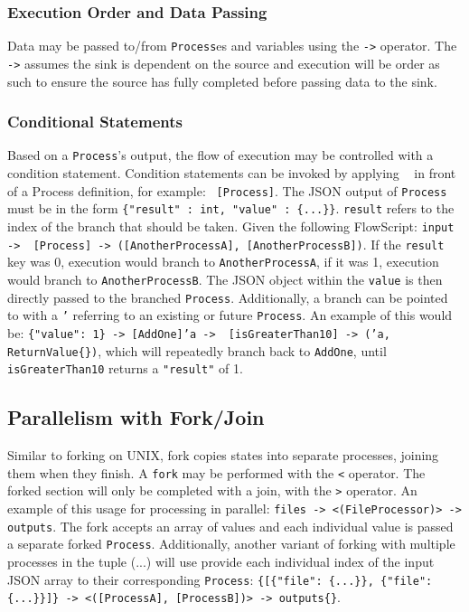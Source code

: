 \documentclass{article}
\begin{document}
			\subsubsection{Execution Order and Data Passing} Data may be passed to/from \texttt{Process}es and variables using the \texttt{->} operator. The \texttt{->} assumes the sink is dependent on the source and execution will be order as such to ensure the source has fully completed before passing data to the sink.
			\subsubsection{Conditional Statements} Based on a \texttt{Process}'s output, the flow of execution may be controlled with a condition statement. Condition statements can be invoked by applying \texttt{~} in front of a Process definition, for example: \texttt{~[Process]}. The JSON output of \texttt{Process} must be in the form \texttt{\{"result" : int, "value" : \{...\}\}}. \texttt{result} refers to the index of the branch that should be taken. Given the following FlowScript: \texttt{input{} -> ~[Process] -> ([AnotherProcessA], [AnotherProcessB])}. If the \texttt{result} key was 0, execution would branch to \texttt{AnotherProcessA}, if it was 1, execution would branch to \texttt{AnotherProcessB}. The JSON object within the \texttt{value} is then directly passed to the branched \texttt{Process}. Additionally, a branch can be pointed to with a \texttt{'} referring to an existing or future \texttt{Process}. An example of this would be: \texttt{\{"value": 1\} -> [AddOne]'a -> ~[isGreaterThan10] -> ('a, ReturnValue\{\})}, which will repeatedly branch back to \texttt{AddOne}, until \texttt{isGreaterThan10} returns a \texttt{"result"} of 1.
			\subsection{Parallelism with Fork/Join} Similar to forking on UNIX, fork copies states into separate processes, joining them when they finish. A \texttt{fork} may be performed with the \texttt{<} operator. The forked section will only be completed with a join, with the \texttt{>} operator. An example of this usage for processing in parallel: \texttt{files{} -> <(FileProcessor)> -> outputs}. The fork accepts an array of values and each individual value is passed a separate forked \texttt{Process}. Additionally, another variant of forking with multiple processes in the tuple (...) will use provide each individual index of the input JSON array to their corresponding \texttt{Process}: \texttt{\{[\{"file": \{...\}\}, \{"file": \{...\}\}]\} -> <([ProcessA], [ProcessB])> -> outputs\{\}}.
\end{document}
